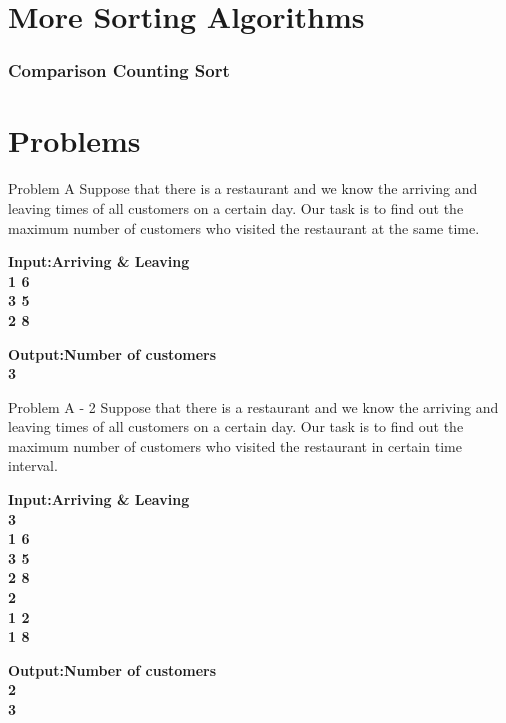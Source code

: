 \documentclass{beamer}
\begin{document}
\section{More Sorting Algorithms}
\begin{frame}
    \frametitle{Comparison Counting Sort}
    \begin{algorithm}[H]
        
    \end{algorithm}
\end{frame}
\section{Problems}
\begin{frame}{Problem A}
    Suppose that there is a restaurant and we know the arriving and leaving times of all customers on a certain day. 
    Our task is to find out the maximum number of customers who visited the restaurant at the same time.\\
    \begin{multicols}{2}
        \begin{flushleft}
            \bf{Input:}\normalfont Arriving \& Leaving\\ 
            1 6\\
            3 5\\
            2 8
        \end{flushleft}
        \vfill\null
        \columnbreak
        \begin{flushleft}
            \bf{Output:}\normalfont Number of customers\\
            3
        \end{flushleft}
    \end{multicols}
\end{frame}
\begin{frame}{Problem A - 2}
    Suppose that there is a restaurant and we know the arriving and leaving times of all customers on a certain day. 
    Our task is to find out the maximum number of customers who visited the restaurant in certain time interval.\\
    \begin{multicols}{2}
        \begin{flushleft}
            \bf{Input:}\normalfont Arriving \& Leaving\\
            3\\
            1 6\\
            3 5\\
            2 8\\
            2\\
            1 2\\
            1 8
        \end{flushleft}
        \vfill\null
        \columnbreak
        \begin{flushleft}
            \bf{Output:}\normalfont Number of customers\\
            2\\
            3
        \end{flushleft}
    \end{multicols}
\end{frame}
\end{document}
